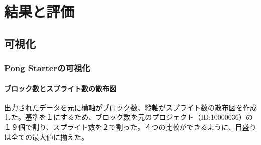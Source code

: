 \documentclass[a4paper,10pt,onecolumn,oneside,openany]{jsbook}
\begin{document}
\part{結果と評価}
\chapter{可視化}
\section{Pong Starterの可視化}

\subsection{ブロック数とスプライト数の散布図}
出力されたデータを元に横軸がブロック数、縦軸がスプライト数の散布図を作成した。基準を１にするため、ブロック数を元のプロジェクト（ID:10000036）の１９個で割り、スプライト数を２で割った。４つの比較ができるように、目盛りは全ての最大値に揃えた。
\end{document}
